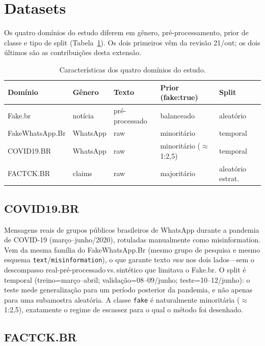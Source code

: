 \documentclass[conference]{IEEEtran}
\begin{document}
\section{Datasets}

Os quatro dom\'inios do estudo diferem em g\^enero, pr\'e-processamento, prior de classe e tipo de split (Tabela~\ref{tab:datasets}). Os dois primeiros v\^em da revis\~ao 21/out; os dois \'ultimos s\~ao as contribui\c{c}\~oes desta extens\~ao.

\begin{table}[t]
\caption{Caracter\'isticas dos quatro dom\'inios do estudo.}\label{tab:datasets}
\centering
\begin{tabular}{lllll}
\toprule
Dom\'inio & G\^enero & Texto & Prior (fake:true) & Split \\
\midrule
Fake.br & not\'icia & pr\'e-processado & balanceado & aleat\'orio \\
FakeWhatsApp.Br & WhatsApp & raw & minorit\'ario & temporal \\
COVID19.BR & WhatsApp & raw & minorit\'ario ($\approx$1:2{,}5) & temporal \\
FACTCK.BR & claims & raw & majorit\'ario & aleat\'orio estrat. \\
\bottomrule
\end{tabular}
\end{table}

\subsection{COVID19.BR}

Mensagens reais de grupos p\'ublicos brasileiros de WhatsApp durante a pandemia de COVID-19 (mar\c{c}o--junho/2020), rotuladas manualmente como misinformation. Vem da mesma fam\'ilia do FakeWhatsApp.Br (mesmo grupo de pesquisa e mesmo esquema \texttt{text}/\texttt{misinformation}), o que garante texto \emph{raw} nos dois lados---sem o descompasso real-pr\'e-processado\,vs.\,sint\'etico que limitava o Fake.br. O split \'e temporal (treino=mar\c{c}o--abril; valida\c{c}\~ao=08--09/junho; teste=10--12/junho): o teste mede generaliza\c{c}\~ao para um per\'iodo posterior da pandemia, e n\~ao apenas para uma subamostra aleat\'oria. A classe \texttt{fake} \'e naturalmente minorit\'aria ($\approx$1:2{,}5), exatamente o regime de escassez para o qual o m\'etodo foi desenhado.

\subsection{FACTCK.BR}
\end{document}
